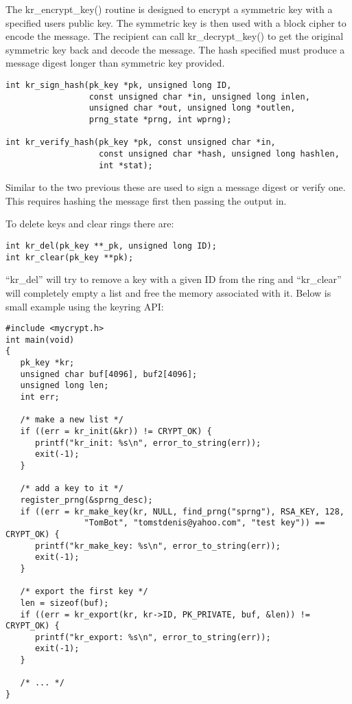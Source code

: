 \documentclass[b5paper]{book}
\begin{document}
The kr\_encrypt\_key() routine is designed to encrypt a symmetric key with a specified users public key.  The symmetric
key is then used with a block cipher to encode the message.  The recipient can call kr\_decrypt\_key() to get the original
symmetric key back and decode the message.  The hash specified must produce a message digest longer than symmetric key 
provided.  

\begin{verbatim}
int kr_sign_hash(pk_key *pk, unsigned long ID, 
                 const unsigned char *in, unsigned long inlen,
                 unsigned char *out, unsigned long *outlen,
                 prng_state *prng, int wprng);

int kr_verify_hash(pk_key *pk, const unsigned char *in, 
                   const unsigned char *hash, unsigned long hashlen,
                   int *stat);
\end{verbatim}

Similar to the two previous these are used to sign a message digest or verify one.  This requires hashing the message
first then passing the output in. 

To delete keys and clear rings there are:
\begin{verbatim}
int kr_del(pk_key **_pk, unsigned long ID);
int kr_clear(pk_key **pk);
\end{verbatim}
``kr\_del'' will try to remove a key with a given ID from the ring and ``kr\_clear'' will completely empty a list and free
the memory associated with it.  Below is small example using the keyring API:

\begin{small}
\begin{verbatim}
#include <mycrypt.h>
int main(void)
{
   pk_key *kr;
   unsigned char buf[4096], buf2[4096];
   unsigned long len;
   int err;

   /* make a new list */
   if ((err = kr_init(&kr)) != CRYPT_OK) {
      printf("kr_init: %s\n", error_to_string(err));
      exit(-1);
   }

   /* add a key to it */
   register_prng(&sprng_desc);
   if ((err = kr_make_key(kr, NULL, find_prng("sprng"), RSA_KEY, 128, 
                "TomBot", "tomstdenis@yahoo.com", "test key")) == CRYPT_OK) {
      printf("kr_make_key: %s\n", error_to_string(err));
      exit(-1);
   }

   /* export the first key */
   len = sizeof(buf);
   if ((err = kr_export(kr, kr->ID, PK_PRIVATE, buf, &len)) != CRYPT_OK) {
      printf("kr_export: %s\n", error_to_string(err));
      exit(-1);
   }

   /* ... */
}  
\end{verbatim}
\end{small}
\end{document}

